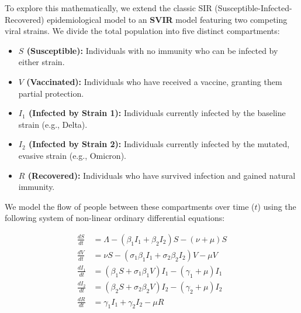 \documentclass[12pt]{article}
\begin{document}
To explore this mathematically, we extend the classic SIR (Susceptible-Infected-Recovered) epidemiological model to an \textbf{SVIR} model featuring two competing viral strains. We divide the total population into five distinct compartments:
\begin{itemize}
    \item \textbf{$S$ (Susceptible):} Individuals with no immunity who can be infected by either strain.
    \item \textbf{$V$ (Vaccinated):} Individuals who have received a vaccine, granting them partial protection.
    \item \textbf{$I_1$ (Infected by Strain 1):} Individuals currently infected by the baseline strain (e.g., Delta).
    \item \textbf{$I_2$ (Infected by Strain 2):} Individuals currently infected by the mutated, evasive strain (e.g., Omicron).
    \item \textbf{$R$ (Recovered):} Individuals who have survived infection and gained natural immunity. 
\end{itemize}

We model the flow of people between these compartments over time ($t$) using the following system of non-linear ordinary differential equations:

\begin{align}
\frac{dS}{dt} &= \Lambda - (\beta_1 I_1 + \beta_2 I_2)S - (\nu + \mu)S \label{eq:S} \\
\frac{dV}{dt} &= \nu S - (\sigma_1 \beta_1 I_1 + \sigma_2 \beta_2 I_2)V - \mu V \label{eq:V} \\
\frac{dI_1}{dt} &= (\beta_1 S + \sigma_1 \beta_1 V)I_1 - (\gamma_1 + \mu)I_1 \label{eq:I1} \\
\frac{dI_2}{dt} &= (\beta_2 S + \sigma_2 \beta_2 V)I_2 - (\gamma_2 + \mu)I_2 \label{eq:I2} \\
\frac{dR}{dt} &= \gamma_1 I_1 + \gamma_2 I_2 - \mu R \label{eq:R}
\end{align}
\end{document}
